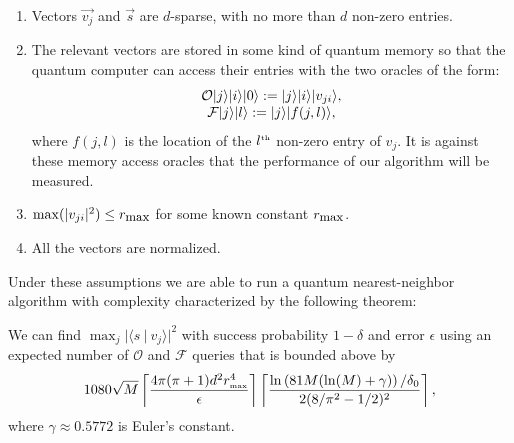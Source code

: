 \begin{enumerate}
\item Vectors $\vec{v_j}$ and $\vec{s}$ are $d$-sparse, with no more than $d$ non-zero entries.
\item The relevant vectors are stored in some kind of quantum memory so that the quantum computer can access their entries with the two oracles of the form:
\begin{equation}
\begin{array}{c}
\mathcal{O}| j \rangle| i \rangle| 0 \rangle:=| j \rangle| i \rangle| v_{ji} \rangle, \\
\mathcal{F}| j \rangle| l \rangle:= | j \rangle| f(j,l) \rangle,
\end{array}
\end{equation}
where $f(j,l)$ is the location of the $l^{\tiny\mbox{th}}$ non-zero entry of $v_j$.  It is against these memory access oracles that the performance of our algorithm will be measured.

\item $\max(|v_{ji}|^2)\le r_{\small\mbox{max}}$ for some known constant $r_{\small\mbox{max}}$.

\item All the vectors are normalized.
 
\end{enumerate}

Under these assumptions we are able to run a quantum nearest-neighbor algorithm with complexity characterized by the following theorem:

\begin{theorem}
We can find $\max_j|\langle s~|~v_j\rangle|^2$ with success probability $1-\delta$ and error $\epsilon$ using an expected number of $\mathcal{O}$ and $\mathcal{F}$ queries that is bounded above by
\begin{equation}
1080\sqrt{M}\left\lceil\frac{4\pi(\pi+1)d^2r^4_{\tiny\mbox{max}}}{\epsilon}\right\rceil\left\lceil \frac{\ln\left(81M(\ln(M)+\gamma)\right)/\delta_0}{2(8/\pi^2-1/2)^2}\right\rceil,
\end{equation}
where $\gamma\approx 0.5772$ is Euler's constant.
\end{theorem}

